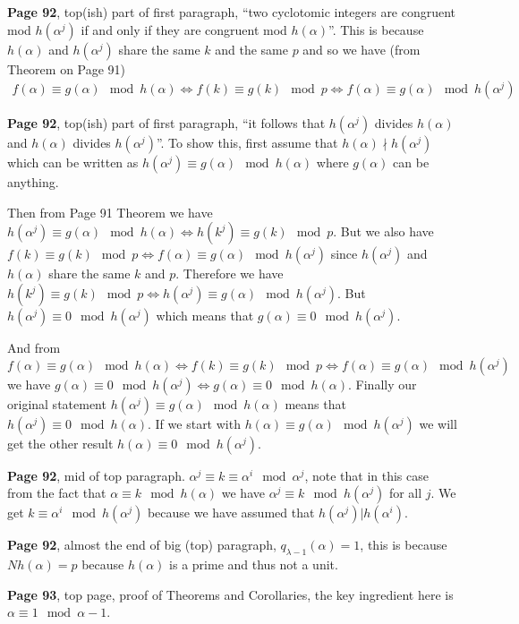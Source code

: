 \documentclass[aps,preprint,preprintnumbers,nofootinbib,showpacs,prd]{revtex4-1}
\newcommand{\nbea}{\begin{eqnarray*}}
\newcommand{\neea}{\end{eqnarray*}}
\begin{document}
{\bf Page 92}, top(ish) part of first paragraph, ``two cyclotomic integers are congruent mod $h(\alpha^j)$ if and only if  they are congruent mod $h(\alpha)$''. This is because $h(\alpha)$ and $h(\alpha^j)$ share the same $k$ and the same $p$ and so we have (from Theorem on Page 91)
%
\nbea
f(\alpha) \equiv g(\alpha) \mod{h(\alpha)} \Longleftrightarrow f(k) \equiv g(k) \mod{p} \Longleftrightarrow f(\alpha) \equiv g(\alpha) \mod{h(\alpha^j)}
\neea
%

{\bf Page 92}, top(ish) part of first paragraph, ``it follows that $h(\alpha^j)$ divides $h(\alpha)$ and $h(\alpha)$ divides $h(\alpha^j)$''. To show this, first assume that $h(\alpha)\nmid h(\alpha^j)$ which can be written as $h(\alpha^j) \equiv g(\alpha) \mod{h(\alpha)}$ where $g(\alpha)$ can be anything.

Then from Page 91 Theorem we have $h(\alpha^j) \equiv g(\alpha) \mod{h(\alpha)} \Longleftrightarrow h(k^j) \equiv g(k) \mod{p}$. But we also have $f(k) \equiv g(k) \mod{p} \Longleftrightarrow f(\alpha) \equiv g(\alpha) \mod{h(\alpha^j)}$ since $h(\alpha^j)$ and $h(\alpha)$ share the same $k$ and $p$. Therefore we have $h(k^j) \equiv g(k) \mod{p} \Longleftrightarrow h(\alpha^j) \equiv g(\alpha) \mod{h(\alpha^j)}$. But $h(\alpha^j) \equiv 0 \mod{h(\alpha^j)}$ which means that $g(\alpha) \equiv 0 \mod{h(\alpha^j)}$.

And from $f(\alpha) \equiv g(\alpha) \mod{h(\alpha)} \Longleftrightarrow f(k) \equiv g(k) \mod{p} \Longleftrightarrow f(\alpha) \equiv g(\alpha) \mod{h(\alpha^j)}$ we have $g(\alpha) \equiv 0 \mod{h(\alpha^j)} \Longleftrightarrow g(\alpha) \equiv 0 \mod{h(\alpha)}$. Finally our original statement $h(\alpha^j) \equiv g(\alpha) \mod{h(\alpha)}$ means that $h(\alpha^j) \equiv 0 \mod{h(\alpha)}$. If we start with $h(\alpha) \equiv g(\alpha) \mod{h(\alpha^j)}$ we will get the other result $h(\alpha) \equiv 0 \mod{h(\alpha^j)}$.

{\bf Page 92}, mid of top paragraph. $\alpha^j \equiv k \equiv \alpha^i \mod{\alpha^j}$, note that in this case from the fact that $\alpha \equiv k \mod{h(\alpha)}$ we have $\alpha^j \equiv k \mod{h(\alpha^j)}$ for all $j$. We get $k \equiv \alpha^i \mod{h(\alpha^j)}$ because we have assumed that $h(\alpha^j)|h(\alpha^i)$.

{\bf Page 92}, almost the end of big (top) paragraph, $q_{\lambda - 1}(\alpha) = 1$, this is because $Nh(\alpha) = p$ because $h(\alpha)$ is a prime and thus not a unit.

{\bf Page 93}, top page, proof of Theorems and Corollaries, the key ingredient here is $\alpha \equiv 1 \mod{\alpha - 1}$.
\end{document}
